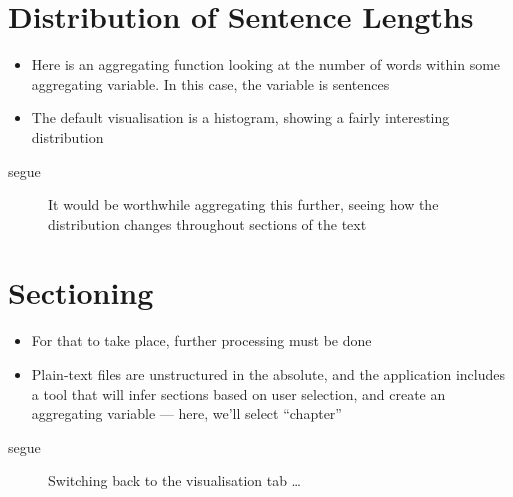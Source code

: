\documentclass[11pt,a4paper]{article}
\begin{document}
\section{Distribution of Sentence Lengths}
\label{sec:distr-sent-lengths}
\begin{itemize}
\item Here is an aggregating function looking at the number of words
  within some aggregating variable. In this case, the variable is
  sentences
\item  The default visualisation is a histogram, showing a
  fairly interesting distribution
\end{itemize}
\begin{description}
\item[segue] It would be worthwhile aggregating this further, seeing
  how the distribution changes throughout sections of the text
\end{description}

\section{Sectioning}
\label{sec:sectioning}
\begin{itemize}
\item For that to take place, further processing must be done
\item Plain-text files are unstructured in the absolute, and the
  application includes a tool that will infer sections based on user
  selection, and create an aggregating variable --- here, we'll select
  \enquote{chapter}
\end{itemize}
\begin{description}
\item[segue] Switching back to the visualisation tab \dots{}
\end{description}
\end{document}

